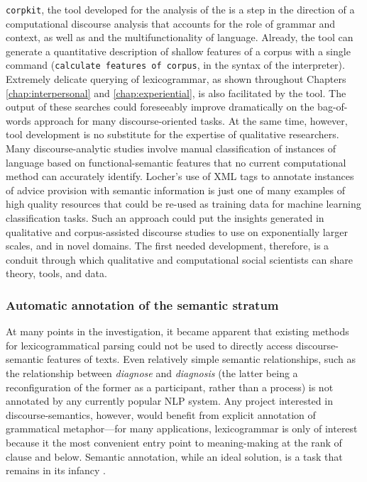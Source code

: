 \texttt{corpkit}, the tool developed for the analysis of the  is a step in the direction of a computational discourse analysis that accounts for the role of grammar and context, as well as and the multifunctionality of language. Already, the tool can generate a quantitative description of shallow features of a \gls{corpus} with a single command (\texttt{calculate features of corpus}, in the syntax of the interpreter). Extremely delicate querying of \gls{lexicogrammar}, as shown throughout Chapters \ref{chap:interpersonal} and \ref{chap:experiential}, is also facilitated by the tool. The output of these searches could foreseeably improve dramatically on the bag\hyp{}of\hyp{}words approach for many discourse\hyp{}oriented tasks. At the same time, however, tool development is no substitute for the expertise of qualitative researchers. Many discourse\hyp{}analytic studies involve manual classification of instances of language based on functional\hyp{}semantic features that no current computational method can accurately identify. Locher's \parencite*{locher2006advice} use of \gls{XML} tags to annotate instances of advice provision with semantic information is just one of many examples of high quality resources that could be re\hyp{}used as training data for machine learning classification tasks. Such an approach could put the insights generated in qualitative and corpus\hyp{}assisted discourse studies to use on exponentially larger scales, and in novel domains. The first needed development, therefore, is a conduit through which qualitative and computational social scientists can share theory, tools, and data.

\subsubsection{Automatic annotation of the semantic stratum}

At many points in the investigation, it became apparent that existing methods for lexicogrammatical parsing could not be used to directly access \gls{discourse-semantic} features of texts. Even relatively simple semantic relationships, such as the relationship between \emph{diagnose} and \emph{diagnosis} (the latter being a reconfiguration of the former as a participant, rather than a process) is not annotated by any currently popular \gls{NLP} system. Any project interested in \glspl{discourse-semantic}, however, would benefit from explicit annotation of grammatical metaphor---for many applications, \gls{lexicogrammar} is only of interest because it the most convenient entry point to meaning\hyp{}making at the rank of clause and below. Semantic annotation, while an ideal solution, is a task that remains in its infancy \cite[see][]{rayson2004ucrel}.

